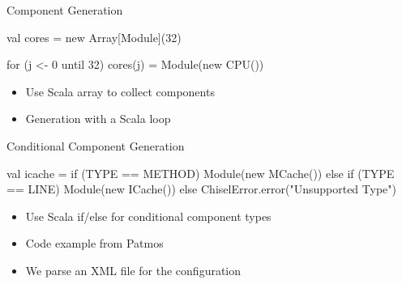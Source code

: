 \begin{frame}[fragile]{Component Generation}
\begin{chisel}
val cores = new Array[Module](32)

for (j <- 0 until 32)
  cores(j) = Module(new CPU())
\end{chisel}
\begin{itemize}
\item Use Scala array to collect components
\item Generation with a Scala loop
\end{itemize}
\end{frame}

\begin{frame}[fragile]{Conditional Component Generation}
\begin{chisel}
val icache =
  if (TYPE == METHOD)
    Module(new MCache())
  else if (TYPE == LINE)
    Module(new ICache())
  else
    ChiselError.error("Unsupported Type")
\end{chisel}
\begin{itemize}
\item Use Scala if/else for conditional component types
\item Code example from Patmos
\item We parse an XML file for the configuration
\end{itemize}
\end{frame}

